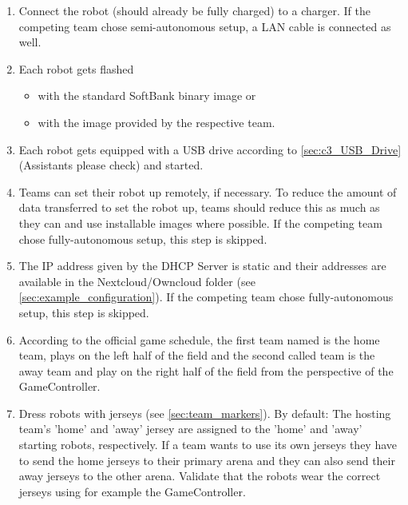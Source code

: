 \begin{enumerate}
        \item Connect the robot (should already be fully charged) to a charger. If the competing team chose semi-autonomous setup, a LAN cable is connected as well.
        \item Each robot gets flashed 
        \begin{itemize}
            \item with the standard SoftBank binary image or
            \item with the image provided by the respective team.
		\end{itemize}
		\item Each robot gets equipped with a USB drive according to \ref{sec:c3_USB_Drive} (Assistants please check) and started.
        \item Teams can set their robot up remotely, if necessary. To reduce the amount of data transferred to set the robot up, teams should reduce this as much as they can and use installable images where possible. If the competing team chose fully-autonomous setup, this step is skipped.
        \item The IP address given by the DHCP Server is static and their addresses are available in the Nextcloud/Owncloud folder (see \ref{sec:example_configuration}). If the competing team chose fully-autonomous setup, this step is skipped.
        \item According to the official game schedule, the first team named is the home team, plays on the left half of the field and the second called team is the away team and play on the right half of the field from the perspective of the GameController. 
        \item Dress robots with jerseys (see \ref{sec:team_markers}). By default: The hosting team's 'home' and 'away' jersey are assigned to the 'home' and 'away' starting robots, respectively. If a team wants to use its own jerseys they have to send the home jerseys to their primary arena and they can also send their away jerseys to the other arena. Validate that the robots wear the correct jerseys using for example the GameController.
    \end{enumerate}

